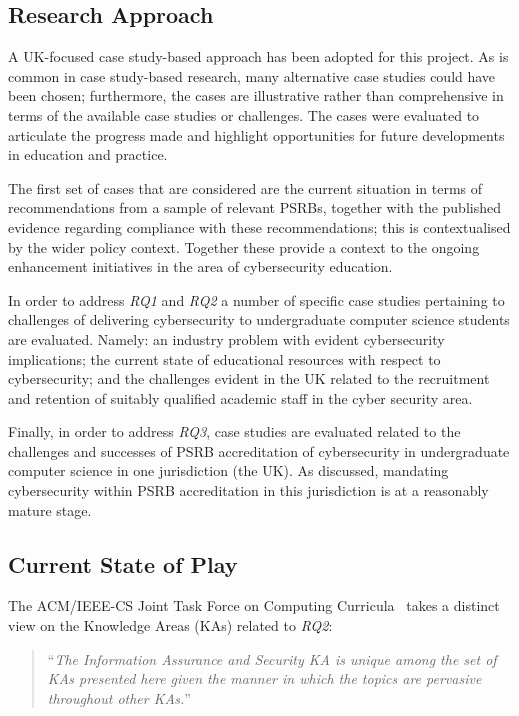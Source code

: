 \documentclass[conference]{IEEEtran}
\begin{document}
\subsection{Research Approach}

A UK-focused case study-based approach has been adopted for this project. As is common in case study-based research, many alternative case studies could have been chosen; furthermore, the cases are illustrative rather than comprehensive in terms of the available case studies or challenges. The cases were evaluated to articulate the progress made and highlight opportunities for future developments in education and practice. 

The first set of cases that are considered are the current situation in terms of recommendations from a sample of relevant PSRBs, together with the published evidence regarding compliance with these recommendations; this is contextualised by the wider policy context. Together these provide a context to the ongoing enhancement initiatives in the area of cybersecurity education.

In order to address {\emph{RQ1}} and {\emph{RQ2}} a number of specific case studies pertaining to challenges of delivering cybersecurity to undergraduate computer science students are evaluated. Namely: an industry problem with evident cybersecurity implications; the current state of educational resources with respect to cybersecurity; and the challenges evident in the UK related to the recruitment and retention of suitably qualified academic staff in the cyber security area. 

Finally, in order to address {\emph{RQ3}}, case studies are evaluated related to the challenges and successes of PSRB accreditation of cybersecurity in undergraduate computer science in one jurisdiction (the UK). As discussed, mandating cybersecurity within PSRB accreditation in this jurisdiction is at a reasonably mature stage.

\subsection{Current State of Play}

The ACM/IEEE-CS Joint Task Force on Computing Curricula~\cite[p.~97]{ACM2013a} takes a distinct view on the Knowledge Areas (KAs) related to {\emph{RQ2}}:

\begin{quote}
``{\emph{The Information Assurance and Security KA is unique among the set of KAs presented here
given the manner in which the topics are pervasive throughout other KAs.}}''
\end{quote}
\end{document}
